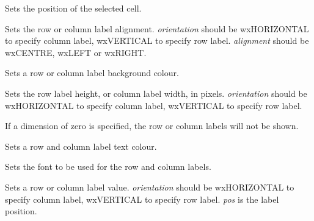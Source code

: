 \label{wxgridsetgridcursor}


Sets the position of the selected cell.

\label{wxgridsetlabelalignment}


Sets the row or column label alignment. {\it orientation} should
be wxHORIZONTAL to specify column label, wxVERTICAL to specify row label.\rtfsp
{\it alignment} should be wxCENTRE, wxLEFT or wxRIGHT.

\label{wxgridsetlabelbackgroundcolour}


Sets a row or column label background colour.

\label{wxgridsetlabelsize}


Sets the row label height, or column label width, in pixels. {\it orientation} should
be wxHORIZONTAL to specify column label, wxVERTICAL to specify row label.

If a dimension of zero is specified, the row or column labels will not be
shown.

\label{wxgridsetlabeltextcolour}


Sets a row and column label text colour.

\label{wxgridsetlabeltextfont}


Sets the font to be used for the row and column labels.

\label{wxgridsetlabelvalue}


Sets a row or column label value. {\it orientation} should
be wxHORIZONTAL to specify column label, wxVERTICAL to specify row label.\rtfsp
{\it pos} is the label position.

